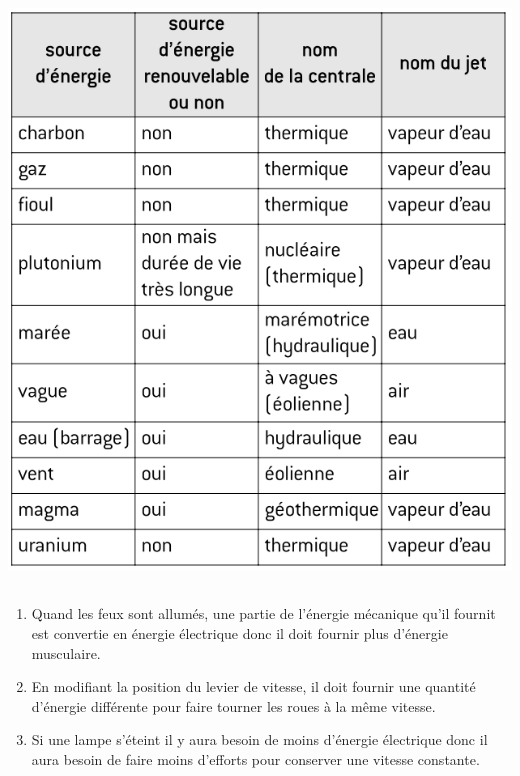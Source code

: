 \documentclass[12pt,a4paper]{article}
\begin{document}
\begin{center}
	\includegraphics[scale=0.6]{exo11}
\end{center}

\subsection*{}

\begin{enumerate}[label=\arabic*.]
	\item Quand les feux sont allumés, une partie de l'énergie mécanique qu'il fournit est convertie en énergie électrique donc il doit fournir plus d'énergie musculaire.
	\item En modifiant la position du levier de vitesse, il doit fournir une quantité d'énergie différente pour faire tourner les roues à la même vitesse.
	\item Si une lampe s'éteint il y aura besoin de moins d'énergie électrique donc il aura besoin de faire moins d'efforts pour conserver une vitesse constante.
\end{enumerate}

\subsection*{}
\end{document}

